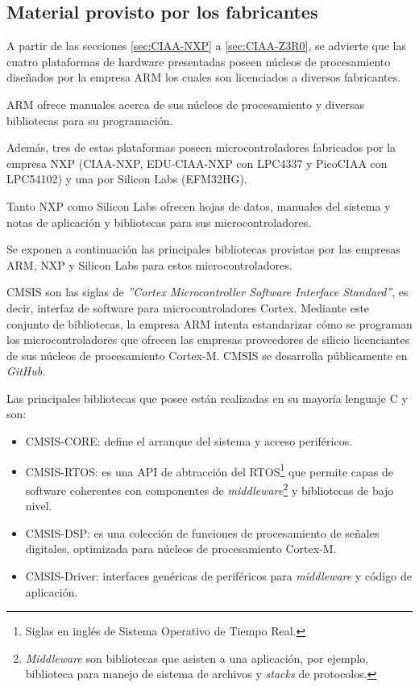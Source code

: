 \subsection{Material provisto por los fabricantes}

A partir de las secciones \ref{sec:CIAA-NXP} a \ref{sec:CIAA-Z3R0}, se advierte que las cuatro plataformas de hardware presentadas poseen núcleos de procesamiento diseñados por la empresa ARM \citep{ARM} los cuales son licenciados a diversos fabricantes.

ARM ofrece manuales acerca de sus núcleos de procesamiento y diversas bibliotecas para su programación.

Además, tres de estas plataformas poseen microcontroladores fabricados por la empresa NXP (CIAA-NXP, EDU-CIAA-NXP con LPC4337 y PicoCIAA con LPC54102) y una por Silicon Labs (EFM32HG). 

Tanto NXP como Silicon Labs ofrecen hojas de datos, manuales del sistema y notas de aplicación y bibliotecas para sus microcontroladores.

Se exponen a continuación las principales bibliotecas provistas por las empresas ARM, NXP y Silicon Labs para estos microcontroladores.


CMSIS \citep{CMSIS} son las siglas de \emph{''Cortex Microcontroller Software Interface Standard''}, es decir, interfaz de software para microcontroladores Cortex. Mediante este conjunto de bibliotecas, la empresa ARM intenta estandarizar cómo se programan los microcontroladores que ofrecen las empresas proveedores de silicio licenciantes de sus núcleos de procesamiento Cortex-M. CMSIS se desarrolla públicamente en \emph{GitHub}. 

Las principales bibliotecas que posee están realizadas en su mayoría lenguaje C y son:

\begin{itemize}
\item
CMSIS-CORE: define el arranque del sistema y acceso periféricos.
\item
CMSIS-RTOS: es una API de abtracción del RTOS\footnote{Siglas en inglés de Sistema Operativo de Tiempo Real.} que permite capas de software coherentes con componentes de \emph{middleware}\footnote{\emph{Middleware} son bibliotecas que asisten a una aplicación, por ejemplo, biblioteca para manejo de sistema de archivos y \emph{stacks} de protocolos.} y bibliotecas de bajo nivel.
\item
CMSIS-DSP: es una colección de funciones de procesamiento de señales digitales, optimizada para núcleos de procesamiento Cortex-M.
\item
CMSIS-Driver: interfaces genéricas de periféricos para \emph{middleware} y código de aplicación.
\end{itemize}

